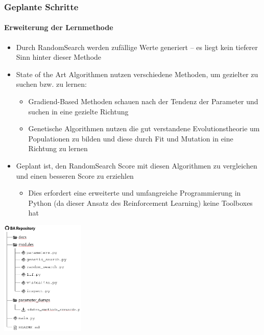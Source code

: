 \documentclass[10pt,t,aspectratio=1610]{beamer}
\begin{document}

\begin{frame}
  \frametitle{Geplante Schritte}
  \framesubtitle{Erweiterung der Lernmethode}

  \vspace{0.5cm}
  \begin{minipage}[c]{0.7\textwidth}
  	\begin{itemize}
  		\item Durch RandomSearch werden zufällige Werte generiert – es liegt kein tieferer Sinn hinter dieser Methode
  		\item State of the Art Algorithmen nutzen verschiedene Methoden, um gezielter zu suchen bzw. zu lernen:
  		\begin{itemize}
  			\item Gradiend-Based Methoden schauen nach der Tendenz der Parameter und suchen in eine gezielte Richtung
  			\item Genetische Algorithmen nutzen die gut verstandene Evolutionstheorie um Populationen zu bilden und diese durch Fit und Mutation in eine Richtung zu lernen
  		\end{itemize}
  		\item Geplant ist, den RandomSearch Score mit diesen Algorithmen zu vergleichen und einen besseren Score zu erziehlen
  		\begin{itemize}
  			\item Dies erfordert eine erweiterte und umfangreiche Programmierung in Python (da dieser Ansatz des Reinforcement Learning) keine Toolboxes hat
  		\end{itemize}
  	\end{itemize}
  \end{minipage}
  \hfill
  \begin{minipage}[c]{0.25\textwidth}
  	\includegraphics[width=4cm]{figures/python_repo.png}
  \end{minipage}

\end{frame}
\end{document}
